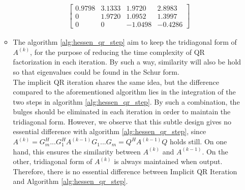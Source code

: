 \documentclass[english,onecolumn]{IEEEtran}
\begin{document}
\begin{enumerate}
\begin{itemize}
\begin{align*}
\begin{bmatrix}
     			0.9798 & 3.1333 & 1.9720 & 2.8983\\
     			0 & 1.9720 & 1.0952 & 1.3997\\
     			0 & 0  & -1.0498 & -0.4286
     	\end{bmatrix}
     \end{align*}
     \item The algorithm  \ref{alg:hessen_qr_step}  aim to keep the tridiagonal form of $A^{(k)}$, for the purpose of  reducing the time complexity of QR factorization in each iteration. By such a way, similarity will  also be hold so that eigenvalues could be found in the Schur form.\\
     	The implicit QR iteration shares the same idea, but the difference compared to the aforementioned algorithm lies in the  integration of the two steps in  algorithm \ref{alg:hessen_qr_step}. By such a combination, the bulges should be eliminated in each iteration in order to maintain the tridiagonal form. However, we observe that this subtle design gives no essential difference with algorithm  \ref{alg:hessen_qr_step}, since $A^{(k)} = G_m^H...G_1^HA^{(k-1)}G_1...G_m = Q^HA^{(k-1)}Q$ holds still. On one hand, this ensures the similarity between $A^{(k)}$ and $A^{(k-1)}$. On the other, tridiagonal form of $A^{(k)}$ is always maintained when output. \\Therefore, there is no essential difference between Implicit QR Iteration and Algorithm \ref{alg:hessen_qr_step}.
    \end{itemize}
\end{enumerate}
\end{document}
